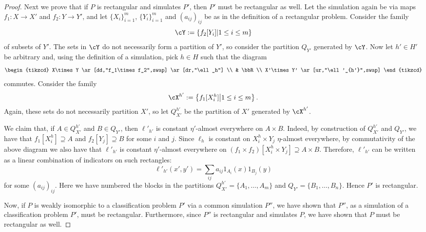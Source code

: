 \documentclass[twoside,11pt]{article}
\newcommand{\set}[2]{\left\{ #1\middle| #2\right\}}
\begin{document}
\begin{proof}
    Next we prove that if $P$ is rectangular and simulates $P'$, then $P'$ must be rectangular as well. Let the simulation again be via maps $f_1:X\to X'$ and $f_2:Y\to Y'$, and let $\{X_i\}_{i=1}^m$, $\{Y_i\}_{i=1}^m$ and $(a_{ij})_{ij}$ be as in the definition of a rectangular problem. Consider the family
    \[\cY := \set{f_2[Y_i]}{1\leq i \leq m}\]
    of subsets of $Y'$. The sets in $\cY$ do not necessarily form a partition of $Y'$, so consider the partition $Q_{Y'}$ generated by $\cY$. Now let $h'\in H'$ be arbitrary and, using the definition of a simulation, pick $h\in H$ such that the diagram
    \[
    \begin{tikzcd}
        X\times Y \ar[dd,"f_1\times f_2",swap] \ar[dr,"\ell_h"]
        \\
        & \bbR
        \\
        X'\times Y' \ar[ur,"\ell'_{h'}",swap]
    \end{tikzcd}    
    \]
    commutes.
    Consider the family
    \[\cX^{h'} := \set{f_1[X^h_i]}{1\leq i \leq m}.\]
    Again, these sets do not necessarily partition $X'$, so let $Q_{X'}^{h'}$ be the partition of $X'$ generated by $\cX^{h'}$.

    We claim that, if $A\in Q_{X'}^{h'}$ and $B\in Q_{Y'}$, then $\ell'_{h'}$ is constant $\eta'$-almost everywhere on $A\times B$. Indeed, by construction of $Q_{X'}^{h'}$ and $Q_{Y'}$, we have that $f_1[X^h_{i}] \supseteq A$ and $f_2[Y_j]\supseteq B$ for some $i$ and $j$. Since $\ell_h$ is constant on $X^h_i \times Y_j$ $\eta$-almost everywhere, by commutativity of the above diagram we also have that $\ell'_{h'}$ is constant $\eta'$-almost everywhere on $(f_1\times f_2)[X^h_i\times Y_j] \supseteq A\times B$. Therefore, $\ell'_{h'}$ can be written as a linear combination of indicators on such rectangles:
    \[\ell'_{h'}(x',y')=\sum_{ij}a_{ij} 1_{A_i}(x) 1_{B_j}(y)\]
    for some $(a_{ij})_{ij}$. Here we have numbered the blocks in the partitions $Q_{X'}^{h'} = \{A_1,\dots, A_m\}$ and $Q_{Y'} = \{B_1,\dots, B_n\}$. Hence $P'$ is rectangular.

    Now, if $P$ is weakly isomorphic to a classification problem $P'$ via a common simulation $P''$, we have shown that $P''$, as a simulation of a classification problem $P'$, must be rectangular. Furthermore, since $P''$ is rectangular and simulates $P$, we have shown that $P$ must be rectangular as well.
\end{proof}

    
    

\end{document}
